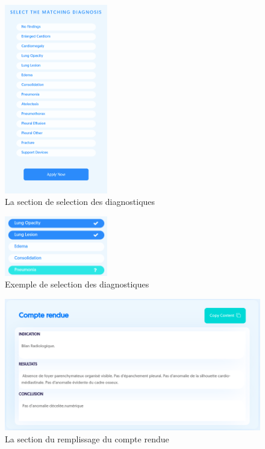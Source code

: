 \documentclass[12pt]{report}
\begin{document}
    \begin{figure}[H]
        \centering
        \includegraphics[width=0.4\textwidth]{xpedia_select_section.png}
        \caption{La section de selection des diagnostiques}\label{fig:xpedia_select_section}
    \end{figure}
    \begin{figure}[H]
        \centering
        \includegraphics[width=0.4\textwidth]{xpedia_select_items.png}
        \caption{Exemple de selection des diagnostiques}\label{fig:xpedia_select_items}
    \end{figure}
    \begin{figure}[H]
        \centering
        \includegraphics[width=\textwidth]{xpedia_cr.png}
        \caption{La section du remplissage du compte rendue}\label{fig:xpedia_cr}
    \end{figure}
\end{document}

